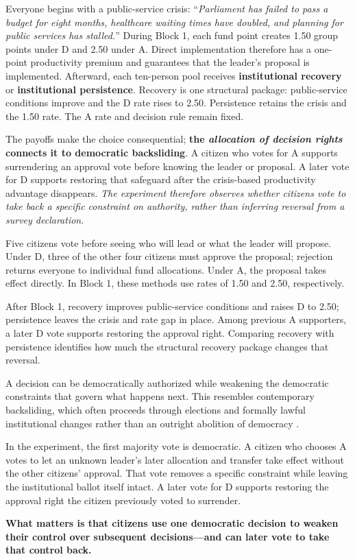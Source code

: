 \documentclass[11pt,a4paper]{article}
\newcommand{\Dproc}{\textsf{D}}
\newcommand{\Aproc}{\textsf{A}}
\begin{document}
Everyone begins with a public-service crisis: \enquote{\emph{Parliament has failed to pass a budget for eight months, healthcare waiting times have doubled, and planning for public services has stalled.}} During Block 1, each fund point creates 1.50 group points under \Dproc{} and 2.50 under \Aproc{}. Direct implementation therefore has a one-point productivity premium and guarantees that the leader's proposal is implemented. Afterward, each ten-person pool receives {\bf institutional recovery} or {\bf institutional persistence}. Recovery is one structural package: public-service conditions improve and the \Dproc{} rate rises to 2.50. Persistence retains the crisis and the 1.50 rate. The \Aproc{} rate and decision rule remain fixed.

The payoffs make the choice consequential; {\bf the \emph{allocation of decision rights} connects it to democratic backsliding}. A citizen who votes for \Aproc{} supports surrendering an approval vote before knowing the leader or proposal. A later vote for \Dproc{} supports restoring that safeguard after the crisis-based productivity advantage disappears. \emph{The experiment therefore observes whether citizens vote to take back a specific constraint on authority, rather than inferring reversal from a survey declaration}.

\begin{plainlanguagebox}
Five citizens vote before seeing who will lead or what the leader will propose. Under \Dproc{}, three of the other four citizens must approve the proposal; rejection returns everyone to individual fund allocations. Under \Aproc{}, the proposal takes effect directly. In Block 1, these methods use rates of 1.50 and 2.50, respectively.

After Block 1, recovery improves public-service conditions and raises \Dproc{} to 2.50; persistence leaves the crisis and rate gap in place. Among previous \Aproc{} supporters, a later \Dproc{} vote supports restoring the approval right. Comparing recovery with persistence identifies how much the structural recovery package changes that reversal.
\end{plainlanguagebox}

\begin{keyinsightbox}
A decision can be democratically authorized while weakening the democratic constraints that govern what happens next. This resembles contemporary backsliding, which often proceeds through elections and formally lawful institutional changes rather than an outright abolition of democracy \parencite{Bermeo2016}.

In the experiment, the first majority vote is democratic. A citizen who chooses \Aproc{} votes to let an unknown leader's later allocation and transfer take effect without the other citizens' approval. That vote removes a specific constraint while leaving the institutional ballot itself intact. A later vote for \Dproc{} supports restoring the approval right the citizen previously voted to surrender.

\medskip
\textbf{What matters is that citizens use one democratic decision to weaken their control over subsequent decisions---and can later vote to take that control back.}
\end{keyinsightbox}
\end{document}
